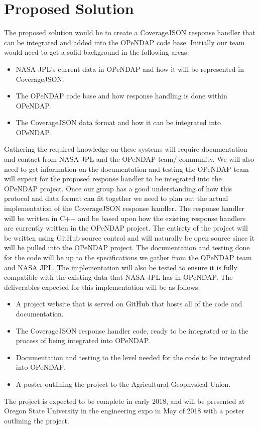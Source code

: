 \documentclass[letterpaper,10pt,draftclsnofoot,onecolumn]{IEEEtran}
\begin{document}
\section{Proposed Solution}
The proposed solution would be to create a CoverageJSON response handler that can be integrated and added into the OPeNDAP code base.
Initially our team would need to get a solid background in the following areas:
 \begin{itemize}
  \item NASA JPL's current data in OPeNDAP and how it will be represented in CoverageJSON.
  \item The OPeNDAP code base and how response handling is done within OPeNDAP.
  \item The CoverageJSON data format and how it can be integrated into OPeNDAP.
\end{itemize}
Gathering the required knowledge on these systems will require documentation and contact from NASA JPL and the OPeNDAP team/ community. We will also need to get information on the documentation and testing the OPeNDAP team will expect for the proposed response handler to be integrated into the OPeNDAP project. Once our group has a good understanding of how this protocol and data format can fit together we need to plan out the actual implementation of the CoverageJSON response handler. The response handler will be written in C++ and be based upon how the existing response handlers are currently written in the OPeNDAP project. The entirety of the project will be written using GitHub source control and will naturally be open source since it will be pulled into the OPeNDAP project. The documentation and testing done for the code will be up to the specifications we gather from the OPeNDAP team and NASA JPL. The implementation will also be tested to ensure it is fully compatible with the existing data that NASA JPL has in OPeNDAP. The deliverables expected for this implementation will be as follows:
 \begin{itemize}
  \item A project website that is served on GitHub that hosts all of the code and documentation.
  \item The CoverageJSON response handler code, ready to be integrated or in the process of being integrated into OPeNDAP.
  \item Documentation and testing to the level needed for the code to be integrated into OPeNDAP.
  \item A poster outlining the project to the Agricultural Geophysical Union.
\end{itemize}
The project is expected to be complete in early 2018, and will be presented at Oregon State University in the engineering expo in May of 2018 with a poster outlining the project.
\end{document}
